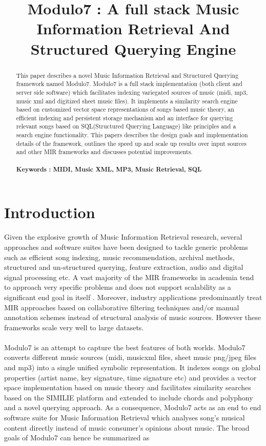 \documentclass{article}
\title{Modulo7 : A full stack Music Information Retrieval And Structured Querying Engine}
\begin{document}
%
\maketitle
%
\begin{abstract}
This paper describes a novel Music Information Retrieval and Structured Querying framework named Modulo7. Modulo7 is a full stack implementation (both client and server side software) which facilitates indexing variegated sources of music (midi, mp3, music xml and digitized sheet music files). It implements a similarity search engine based on customized vector space representations of songs based music theory, an efficient indexing and persistent storage mechanism and an interface for querying relevant songs based on SQL(Structured Querying Language) like principles and a search engine functionality. This papers describes the design goals and implementation details of the framework, outlines the speed up and scale up results over input sources and other MIR frameworks and discusses potential improvements. \\\\
\textbf{Keywords : MIDI, Music XML, MP3, Music Retrieval, SQL}
\end{abstract}
%
\section{Introduction}\label{sec:introduction}

Given the explosive growth of Music Information Retrieval research, several approaches and software suites have been designed to tackle generic problems such as efficient song indexing, music recommendation, archival methods, structured and un-structured querying, feature extraction, audio and digital signal processing etc. A vast majority of the MIR frameworks in academia tend to approach very specific problems and does not support scalability as a significant end goal in itself \cite{mirproblems}. Moreover, industry applications predominantly treat MIR approaches based on collaborative filtering techniques \cite{amazonreco} and/or manual annotation schemes \cite{musicgenomepandora} instead of structural analysis of music sources. However these frameworks scale very well to large datasets. \\\\
Modulo7 is an attempt to capture the best features of both worlds. Modulo7 converts different music sources (midi, musicxml files, sheet music png/jpeg files and mp3) into a single unified symbolic representation. It indexes songs on global properties (artist name, key signature, time signature etc) and provides a vector space implementation based on music theory and facilitates similarity searches based on the SIMILIE \cite{similie} platform and extended to include chords and polyphony and a novel querying approach. As a consequence, Modulo7 acts as an end to end software suite for Music Information Retrieval which analyses song's musical content directly instead of music consumer's opinions about music. The broad goals of Modulo7 can hence be summarized as
\end{document}

